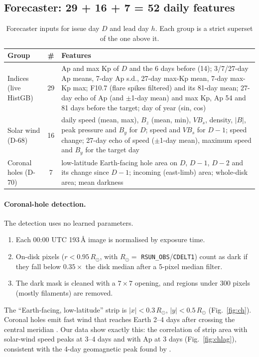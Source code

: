 \documentclass[11pt,a4paper]{article}
\newcommand{\code}[1]{\texttt{\small #1}}
\begin{document}
\subsection{Forecaster: 29 + 16 + 7 = 52 daily features}
\begin{table}[htbp]\centering\small
\caption{Forecaster inputs for issue day $D$ and lead day $h$. Each group is a strict superset of the one above it.}\label{tab:feat}
\begin{tabularx}{\textwidth}{@{}p{3.1cm}cY@{}}\toprule
Group & \# & Features\\\midrule
Indices (live HistGB) & 29 & Ap and max Kp of $D$ and the 6 days before (14); 3/7/27-day Ap means, 7-day Ap s.d., 27-day max-Kp mean, 7-day max-Kp max; F10.7 (flare spikes filtered) and its 81-day mean; 27-day echo of Ap (and $\pm$1-day mean) and max Kp, Ap 54 and 81 days before the target; day of year (sin, cos)\\
Solar wind (D-68) & 16 & daily speed (mean, max), $B_z$ (mean, min), $VB_s$, density, $|B|$, peak pressure and $B_y$ for $D$; speed and $VB_s$ for $D-1$; speed change; 27-day echo of speed ($\pm$1-day mean), maximum speed and $B_y$ for the target day\\
Coronal holes (D-70) & 7 & low-latitude Earth-facing hole area on $D$, $D-1$, $D-2$ and its change since $D-1$; incoming (east-limb) area; whole-disk area; mean darkness\\\bottomrule
\end{tabularx}
\end{table}

\paragraph{Coronal-hole detection.} The detection uses no learned parameters.
\begin{enumerate}
\item Each 00:00 UTC 193\,\AA{} image is normalised by exposure time.
\item On-disk pixels ($r<0.95\,R_\odot$, with $R_\odot=$ \code{RSUN\_OBS}/\code{CDELT1}) count as dark if they fall
below $0.35\times$ the disk median after a 5-pixel median filter.
\item The dark mask is cleaned with a $7\times7$ opening, and regions under 300 pixels (mostly filaments) are
removed.
\end{enumerate}
The ``Earth-facing, low-latitude'' strip is $|x|<0.3\,R_\odot$, $|y|<0.5\,R_\odot$ (Fig.~\ref{fig:ch}). Coronal
holes emit fast wind that reaches Earth 2--4 days after crossing the central meridian
\cite{krieger1973,vrsnak2007a,rotter2012}. Our data show exactly this: the correlation of strip area with
solar-wind speed peaks at 3--4 days and with Ap at 3 days (Fig.~\ref{fig:chlag}), consistent with the 4-day
geomagnetic peak found by \cite{vrsnak2007b}.
\end{document}
